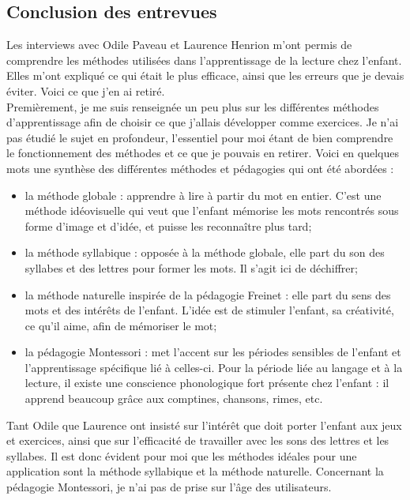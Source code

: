 \subsection{Conclusion des entrevues}
Les interviews avec Odile Paveau et Laurence Henrion m'ont permis de comprendre les méthodes utilisées dans l'apprentissage de la lecture chez l'enfant. Elles m'ont expliqué ce qui était le plus efficace, ainsi que les erreurs que je devais éviter. Voici ce que j'en ai retiré.\\

Premièrement, je me suis renseignée un peu plus sur les différentes méthodes d'apprentissage afin de choisir ce que j'allais développer comme exercices. Je n'ai pas étudié le sujet en profondeur, l'essentiel pour moi étant de bien comprendre le fonctionnement des méthodes et ce que je pouvais en retirer. Voici en quelques mots une synthèse des différentes méthodes et pédagogies qui ont été abordées :
\begin{itemize}
\item la méthode globale : apprendre à lire à partir du mot en entier. C'est une méthode idéovisuelle qui veut que l'enfant mémorise les mots rencontrés sous forme d'image et d'idée, et puisse les reconnaître plus tard;
\item la méthode syllabique : opposée à la méthode globale, elle part du son des syllabes et des lettres pour former les mots. Il s'agit ici de déchiffrer;
\item la méthode naturelle inspirée de la pédagogie Freinet : elle part du sens des mots et des intérêts de l'enfant. L'idée est de stimuler l'enfant, sa créativité, ce qu'il aime, afin de mémoriser le mot;
\item la pédagogie Montessori : met l'accent sur les périodes sensibles de l'enfant et l'apprentissage spécifique lié à celles-ci. Pour la période liée au langage et à la lecture, il existe une conscience phonologique fort présente chez l'enfant : il apprend beaucoup grâce aux comptines, chansons, rimes, etc.
\end{itemize}
Tant Odile que Laurence ont insisté sur l'intérêt que doit porter l'enfant aux jeux et exercices, ainsi que sur l'efficacité de travailler avec les sons des lettres et les syllabes. Il est donc évident pour moi que les méthodes idéales pour une application sont la méthode syllabique et la méthode naturelle. Concernant la pédagogie Montessori, je n'ai pas de prise sur l'âge des utilisateurs.\\

